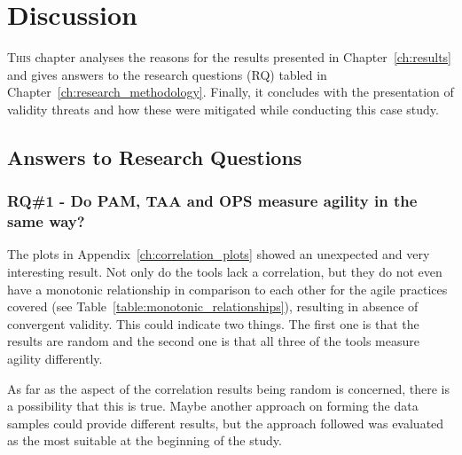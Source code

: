 %


\chapter{Discussion}
\label{ch:discussion}
\lettrine[lines=4, loversize=-0.1, lraise=0.1]{T}{his} chapter analyses the reasons for the results presented in Chapter~\ref{ch:results} and gives answers to the research questions (RQ) tabled in Chapter~\ref{ch:research_methodology}. Finally, it concludes with the presentation of validity threats and how these were mitigated while conducting this case study.

\section{Answers to Research Questions}

\subsection{RQ\#1 - Do PAM, TAA and OPS measure agility in the same way?}

The plots in Appendix~\ref{ch:correlation_plots} showed an unexpected and very interesting result. Not only do the tools lack a correlation, but they do not even have a monotonic relationship in comparison to each other for the agile practices covered (see Table~\ref{table:monotonic_relationships}), resulting in absence of convergent validity. This could indicate two things. The first one is that the results are random and the second one is that all three of the tools measure agility differently. 

As far as the aspect of the correlation results being random is concerned, there is a possibility that this is true. Maybe another approach on forming the data samples could provide different results, but the approach followed was evaluated as the most suitable at the beginning of the study.

